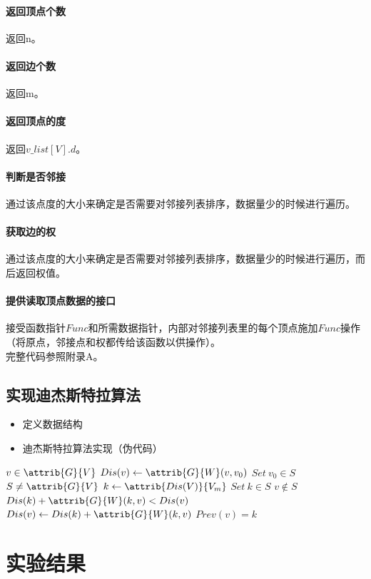 \documentclass[a4paper,10pt]{ctexart}
\begin{document}
\paragraph{返回顶点个数}返回n。
\paragraph{返回边个数}返回m。
\paragraph{返回顶点的度}返回$v\_list[V].d$。
\paragraph{判断是否邻接}通过该点度的大小来确定是否需要对邻接列表排序，数据量少的时候进行遍历。
\paragraph{获取边的权}通过该点度的大小来确定是否需要对邻接列表排序，数据量少的时候进行遍历，而后返回权值。
\paragraph{提供读取顶点数据的接口}接受函数指针$Func$和所需数据指针，内部对邻接列表里的每个顶点施加$Func$操作（将原点，邻接点和权都传给该函数以供操作）。
\\ 完整代码参照附录A。

\subsection{实现迪杰斯特拉算法}
\begin{itemize}
  \item 定义数据结构
  \item 迪杰斯特拉算法实现（伪代码）
\end{itemize}
\begin{codebox}
\li \For $v \in \attrib{G}{V}$
    \Do
\li     $Dis(v) \gets \attrib{G}{W}(v,v_0)$
    \End
\li $Set \  v_0 \in S$
\li \While $S \ne \attrib{G}{V}$
    \Do
\li     $k \gets \attrib{Dis(V)}{V_m}$
\li     $Set \  k \in S$
\li     \For $v \notin S$
        \Do
\li        \If $Dis(k) + \attrib{G}{W}(k,v) < Dis(v)$
\li        \Then $Dis(v) \gets Dis(k) + \attrib{G}{W}(k,v)$
\li        $Prev(v) = k $
        \End
    \End
\end{codebox}
\section{实验结果}
\end{document}

